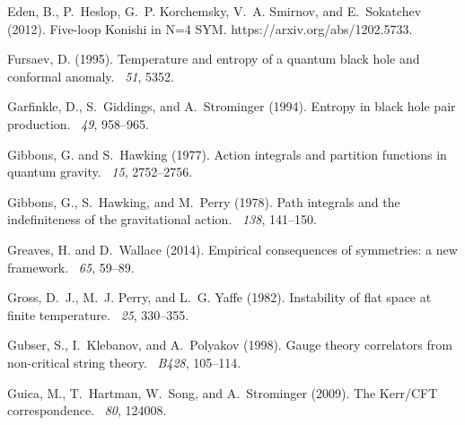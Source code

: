 \documentclass[12pt]{article}
\begin{document}
\begin{thebibliography}{}
Eden, B., P.~Heslop, G.~P. Korchemsky, V.~A. Smirnov, and E.~Sokatchev (2012).
\newblock Five-loop {K}onishi in {N}=4 {SYM}.
\newblock https://arxiv.org/abs/1202.5733.

Fursaev, D. (1995).
\newblock Temperature and entropy of a quantum black hole and conformal
  anomaly.
~{\em 51}, 5352.

Garfinkle, D., S.~Giddings, and A.~Strominger (1994).
\newblock Entropy in black hole pair production.
~{\em 49}, 958--965.

Gibbons, G. and S.~Hawking (1977).
\newblock Action integrals and partition functions in quantum gravity.
~{\em 15}, 2752--2756.

Gibbons, G., S.~Hawking, and M.~Perry (1978).
\newblock Path integrals and the indefiniteness of the gravitational action.
~{\em 138}, 141--150.

Greaves, H. and D.~Wallace (2014).
\newblock Empirical consequences of symmetries: a new framework.
~{\em 65},
  59--89.

Gross, D.~J., M.~J. Perry, and L.~G. Yaffe (1982).
\newblock Instability of flat space at finite temperature.
~{\em 25}, 330--355.

Gubser, S., I.~Klebanov, and A.~Polyakov (1998).
\newblock Gauge theory correlators from non-critical string theory.
~{\em B428}, 105--114.

Guica, M., T.~Hartman, W.~Song, and A.~Strominger (2009).
\newblock The {K}err/{CFT} correspondence.
~{\em 80}, 124008.


\end{thebibliography}
\end{document}
